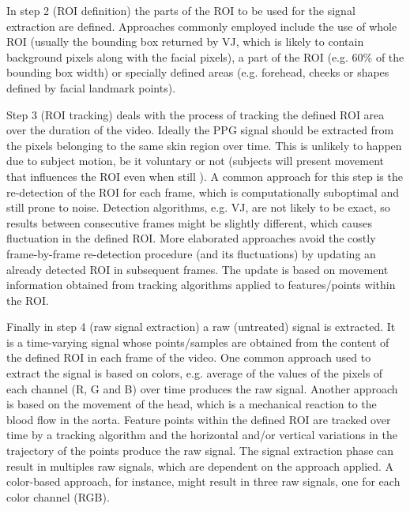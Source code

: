 In step 2 (ROI definition) the parts of the ROI to be used for the signal extraction are defined. Approaches commonly employed include the use of whole ROI (usually the bounding box returned by VJ, which is likely to contain background pixels along with the facial pixels), a part of the ROI (e.g. 60\% of the bounding box width) or specially defined areas (e.g. forehead, cheeks or shapes defined by facial landmark points).

Step 3 (ROI tracking) deals with the process of tracking the defined ROI area over the duration of the video. Ideally the PPG signal should be extracted from the pixels belonging to the same skin region over time. This is unlikely to happen due to subject motion, be it voluntary or not (subjects will present movement that influences the ROI even when still \parencite{poh2010non}). A common approach for this step is the re-detection of the ROI for each frame, which is computationally suboptimal and still prone to noise. Detection algorithms, e.g. VJ, are not likely to be exact, so results between consecutive frames might be slightly different, which causes fluctuation in the defined ROI. More elaborated approaches avoid the costly frame-by-frame re-detection procedure (and its fluctuations) by updating an already detected ROI in subsequent frames. The update is based on movement information obtained from tracking algorithms applied to features/points within the ROI. %

Finally in step 4 (raw signal extraction) a raw (untreated) signal is extracted. It is a time-varying signal whose points/samples are obtained from the content of the defined ROI in each frame of the video. One common approach used to extract the signal is based on colors, e.g. average of the values of the pixels of each channel (R, G and B) over time produces the raw signal. Another approach is based on the movement of the head, which is a mechanical reaction to the blood flow in the aorta. Feature points within the defined ROI are tracked over time by a tracking algorithm and the horizontal and/or vertical variations in the trajectory of the points produce the raw signal. The signal extraction phase can result in multiples raw signals, which are dependent on the approach applied. A color-based approach, for instance, might result in three raw signals, one for each color channel (RGB).

